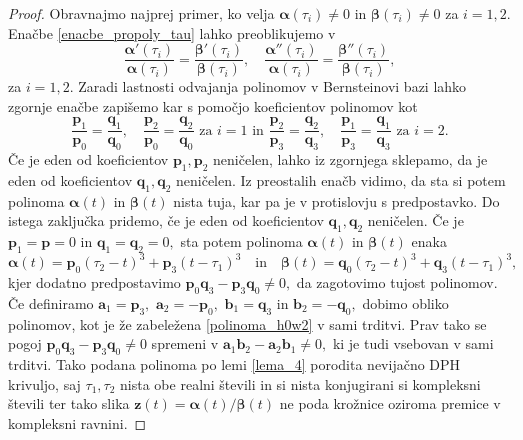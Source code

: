 \documentclass[12pt,a4paper,twoside]{article}
\theoremstyle{definition} %
\theoremstyle{plain} %
\numberwithin{equation}{section}  %
\newcommand{\aV}{\mathbf{a}}
\newcommand{\bV}{\mathbf{b}}
\newcommand{\pV}{\mathbf{p}}
\newcommand{\qV}{\mathbf{q}}
\newcommand{\zV}{\mathbf{z}}
\newcommand{\balpha}{\boldsymbol \alpha}
\newcommand{\bbeta}{\boldsymbol \beta}
\begin{document}
\begin{proof}
	Obravnajmo najprej primer, ko velja $\balpha(\tau_i)\neq0$ in $\bbeta(\tau_i)\neq0$ za $i=1,2.$ Enačbe \eqref{enacbe_propoly_tau} lahko preoblikujemo v
	\begin{equation*}
		\frac{\balpha'(\tau_i)}{\balpha(\tau_i)}=\frac{\bbeta'(\tau_i)}{\bbeta(\tau_i)},\quad\frac{\balpha''(\tau_i)}{\balpha(\tau_i)}=\frac{\bbeta''(\tau_i)}{\bbeta(\tau_i)},
	\end{equation*}
	za $i=1,2.$ Zaradi lastnosti odvajanja polinomov v Bernsteinovi bazi lahko zgornje enačbe zapišemo kar s pomočjo koeficientov polinomov kot
	\begin{equation*}
		\frac{\pV_1}{\pV_0}=\frac{\qV_1}{\qV_0},\quad\frac{\pV_2}{\pV_0}=\frac{\qV_2}{\qV_0}\text{ za }i=1\text{ in }\frac{\pV_2}{\pV_3}=\frac{\qV_2}{\qV_3},\quad\frac{\pV_1}{\pV_3}=\frac{\qV_1}{\qV_3}\text{ za }i=2.
	\end{equation*}
	Če je eden od koeficientov $\pV_1,\pV_2$ neničelen, lahko iz zgornjega sklepamo, da je eden od koeficientov $\qV_1,\qV_2$ neničelen. Iz preostalih enačb vidimo, da sta si potem polinoma $\balpha(t)$ in $\bbeta(t)$ nista tuja, kar pa je v protislovju s predpostavko. Do istega zaključka pridemo, če je eden od koeficientov $\qV_1,\qV_2$ neničelen. Če je $\pV_1=\pV=0$ in $\qV_1=\qV_2=0,$ sta potem polinoma $\balpha(t)$ in $\bbeta(t)$ enaka
	\begin{equation*}
		\balpha(t)=\pV_0(\tau_2-t)^3+\pV_3(t-\tau_1)^3\quad\text{in}\quad\bbeta(t)=\qV_0(\tau_2-t)^3+\qV_3(t-\tau_1)^3,
	\end{equation*}
	kjer dodatno predpostavimo $\pV_0\qV_3-\pV_3\qV_0\neq0,$ da zagotovimo tujost polinomov. Če definiramo $\aV_1=\pV_3,$ $\aV_2=-\pV_0,$ $\bV_1=\qV_3$ in $\bV_2=-\qV_0,$ dobimo obliko polinomov, kot je že zabeležena \eqref{polinoma_h0w2} v sami trditvi. Prav tako se pogoj $\pV_0\qV_3-\pV_3\qV_0\neq0$ spremeni v $\aV_1\bV_2-\aV_2\bV_1\neq0,$ ki je tudi vsebovan v sami trditvi. Tako podana polinoma po lemi \ref{lema_4} porodita nevijačno DPH krivuljo, saj $\tau_1,\tau_2$ nista obe realni števili in si nista konjugirani si kompleksni števili ter tako slika $\zV(t)=\balpha(t)/\bbeta(t)$ ne poda krožnice oziroma premice v kompleksni ravnini.
	

\end{proof}
\end{document}
